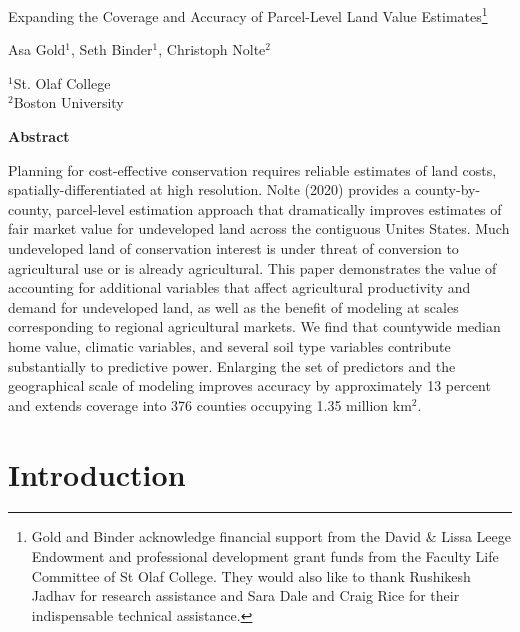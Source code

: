 \documentclass[12pt]{article}
\begin{document}
\hspace{5pt}

\Large
 \begin{center}
Expanding the Coverage and Accuracy of Parcel-Level Land Value Estimates\footnote[2]{Gold and Binder acknowledge financial support from the David \& Lissa Leege Endowment and professional development grant funds from the Faculty Life Committee of St Olaf College. They would also like to thank Rushikesh Jadhav for research assistance and Sara Dale and Craig Rice for their indispensable technical assistance.}\\ 

\vspace{10pt}

\large
Asa Gold$^1$, Seth Binder$^1$, Christoph Nolte$^2$ \\

\vspace{10pt}

\footnotesize  
$^{1}$St. Olaf College\\
$^2$Boston University

\vspace{40pt} 

    \normalsize
    \textbf{Abstract}
\end{center}

\small
Planning for cost-effective conservation requires reliable estimates of land costs, spatially-differentiated at high resolution. Nolte (2020) provides a county-by-county, parcel-level estimation approach that dramatically improves estimates of fair market value for undeveloped land across the contiguous Unites States. Much undeveloped land of conservation interest is under threat of conversion to agricultural use or is already agricultural. This paper demonstrates the value of accounting for additional variables that affect agricultural productivity and demand for undeveloped land, as well as the benefit of modeling at scales corresponding to regional agricultural markets. We find that countywide median home value, climatic variables, and several soil type variables contribute substantially to predictive power. Enlarging the set of predictors and the geographical scale of modeling improves accuracy by approximately 13 percent and extends coverage into 376 counties occupying 1.35 million km$^2$.

\newpage

\section{Introduction}
\end{document}
